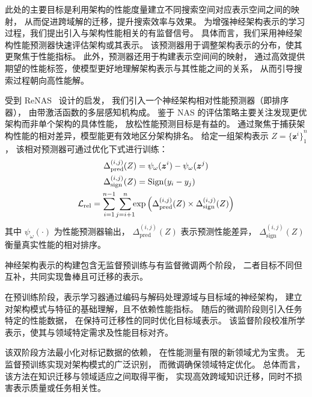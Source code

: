 \documentclass[../main.tex]{subfiles}
\begin{document}
\label{sec:ch4-5-3-nas-relative-performance-predictor}

此处的主要目标是利用架构的性能度量建立不同搜索空间对应表示空间之间的映射，
从而促进跨域解的迁移，提升搜索效率与效果。
为增强神经架构表示的学习过程，我们提出引入与架构性能相关的有监督信号。
具体而言，我们采用神经架构性能预测器快速评估架构或其表示。
该预测器用于调整架构表示的分布，使其更聚焦于性能指标。
此外，预测器还用于构建表示空间间的映射，
通过高效提供期望的性能标签，使模型更好地理解架构表示与其性能之间的关系，
从而引导搜索过程朝向高性能解。

受到 ReNAS~\cite{renasrelativisticevaluation_xu_2021} 设计的启发，
我们引入一个神经架构相对性能预测器（即排序器），
由带激活函数的多层感知机构成。
鉴于 NAS 的评估策略主要关注发现更优架构而非单个架构的具体性能，
放松性能预测目标是有益的。
通过聚焦于捕获架构性能的相对差异，模型能更有效地区分架构排名。
给定一组架构表示 $ Z = {\{ \bm{z}^{i} \}}_{1}^{n} $，
该相对预测器可通过优化下式进行训练：
\begin{gather}
	\begin{aligned}
		\Delta_{\mathrlap{\mathrm{pred}}}^{(i,j)}(Z) & = \psi_{\omega}(\bm{z}^i) - \psi_{\omega}(\bm{z}^j) \\
		\Delta_{\mathrlap{\mathrm{sign}}}^{(i,j)}(Z) & = \mathrm{Sign}(y_i-y_j)
	\end{aligned} \notag \\
	\mathcal{L}_\mathrm{rel} = \sum_{\mathclap{i=1}}^{n-1}{\;\sum_{\mathclap{j=i+1}}^{n}{\exp{\left( \Delta_\mathrm{pred}^{(i,j)}(Z) \times \Delta_\mathrm{sign}^{(i,j)}(Z)\right)}}}
\end{gather}
其中 $ \psi_\omega(\cdot) $ 为性能预测器输出，
$ \Delta_{\mathrm{pred}}^{(i,j)}(Z) $ 表示预测性能差异，
$ \Delta_{\mathrm{sign}}^{(i,j)}(Z) $ 衡量真实性能的相对排序。

\label{sec:ch4-5-4-mixed-supervision-training}

神经架构表示的构建包含无监督预训练与有监督微调两个阶段，
二者目标不同但互补，共同实现鲁棒且可迁移的表示。

在预训练阶段，表示学习器通过编码与解码处理源域与目标域的神经架构，
建立对架构模式与特征的基础理解，且不依赖性能指标。
随后的微调阶段则引入任务特定的性能数据，
在保持可迁移性的同时优化目标域表示。
该监督阶段校准所学表示，使其与领域特定需求及性能目标对齐。

该双阶段方法最小化对标记数据的依赖，
在性能测量有限的新领域尤为宝贵。
无监督预训练实现对架构模式的广泛识别，
而微调确保领域特定优化。
总体而言，该方法在知识迁移与领域适应之间取得平衡，
实现高效跨域知识迁移，同时不损害表示质量或任务相关性。
\end{document}
